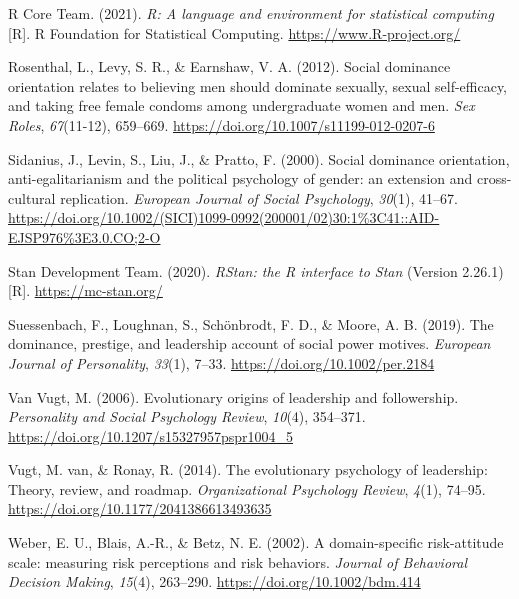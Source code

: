 \documentclass[
  english,
  a4paper,floatsintext]{apa7}
\newlength{\cslhangindent}
\newlength{\cslentryspacingunit} %
\newenvironment{CSLReferences}[2] %
 {%
  \setlength{\parindent}{0pt}
  \ifodd #1
  \let\oldpar\par
  \def\par{\hangindent=\cslhangindent\oldpar}
  \fi
  \setlength{\parskip}{#2\cslentryspacingunit}
 }%
 {}
\begin{document}
\begin{CSLReferences}{1}{0}
\leavevmode{}%
R Core Team. (2021). \emph{R: A language and environment for statistical computing} {[}R{]}. R Foundation for Statistical Computing. \url{https://www.R-project.org/}

\leavevmode{}%
Rosenthal, L., Levy, S. R., \& Earnshaw, V. A. (2012). Social dominance orientation relates to believing men should dominate sexually, sexual self-efficacy, and taking free female condoms among undergraduate women and men. \emph{Sex Roles}, \emph{67}(11-12), 659--669. \url{https://doi.org/10.1007/s11199-012-0207-6}

\leavevmode{}%
Sidanius, J., Levin, S., Liu, J., \& Pratto, F. (2000). Social dominance orientation, anti-egalitarianism and the political psychology of gender: an extension and cross-cultural replication. \emph{European Journal of Social Psychology}, \emph{30}(1), 41--67. \url{https://doi.org/10.1002/(SICI)1099-0992(200001/02)30:1\%3C41::AID-EJSP976\%3E3.0.CO;2-O}

\leavevmode{}%
Stan Development Team. (2020). \emph{RStan: the R interface to Stan} (Version 2.26.1) {[}R{]}. \url{https://mc-stan.org/}

\leavevmode{}%
Suessenbach, F., Loughnan, S., Schönbrodt, F. D., \& Moore, A. B. (2019). The dominance, prestige, and leadership account of social power motives. \emph{European Journal of Personality}, \emph{33}(1), 7--33. \url{https://doi.org/10.1002/per.2184}

\leavevmode{}%
Van Vugt, M. (2006). Evolutionary origins of leadership and followership. \emph{Personality and Social Psychology Review}, \emph{10}(4), 354--371. \url{https://doi.org/10.1207/s15327957pspr1004_5}

\leavevmode{}%
Vugt, M. van, \& Ronay, R. (2014). The evolutionary psychology of leadership: Theory, review, and roadmap. \emph{Organizational Psychology Review}, \emph{4}(1), 74--95. \url{https://doi.org/10.1177/2041386613493635}

\leavevmode{}%
Weber, E. U., Blais, A.-R., \& Betz, N. E. (2002). A domain-specific risk-attitude scale: measuring risk perceptions and risk behaviors. \emph{Journal of Behavioral Decision Making}, \emph{15}(4), 263--290. \url{https://doi.org/10.1002/bdm.414}


\end{CSLReferences}
\end{document}

